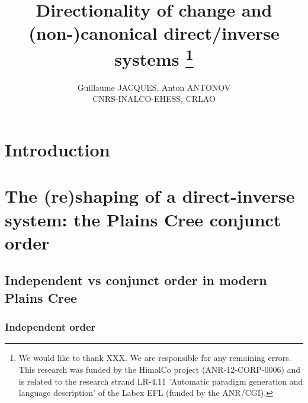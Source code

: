 \documentclass[twoside,a4paper,11pt]{article}
\newcommand{\Σ}{\greek{Σ}}
\begin{document}
\linenumbers
\title{Directionality of change and   (non-)canonical direct/inverse systems \footnote{We would like to thank XXX. We are responsible for any remaining errors. This research was funded by the HimalCo project (ANR-12-CORP-0006) and is related to the research strand LR-4.11 'Automatic paradigm generation and language description' of the Labex EFL (funded by the ANR/CGI). } }

\author{Guillaume JACQUES, Anton ANTONOV\\ CNRS-INALCO-EHESS, CRLAO}
\maketitle
\section{Introduction}

\section{The (re)shaping of a direct-inverse system: the Plains Cree conjunct order }

\subsection{Independent vs conjunct order in modern Plains Cree}



\subsubsection{Independent order}
\end{document}
